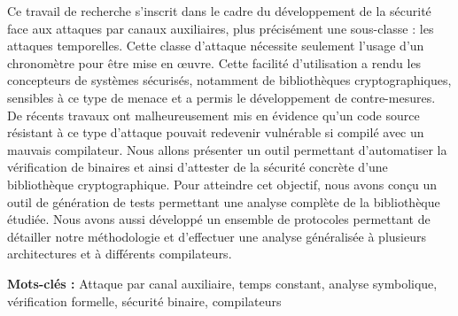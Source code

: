 Ce travail de recherche s'inscrit dans le cadre du développement de la sécurité face aux attaques par canaux auxiliaires, plus précisément une sous-classe : les attaques temporelles. Cette classe d'attaque nécessite seulement l'usage d'un chronomètre pour être mise en œuvre. Cette facilité d'utilisation a rendu les concepteurs de systèmes sécurisés, notamment de bibliothèques cryptographiques, sensibles à ce type de menace et a permis le développement de contre-mesures. De récents travaux ont malheureusement mis en évidence qu'un code source résistant à ce type d'attaque pouvait redevenir vulnérable si compilé avec un mauvais compilateur. Nous allons présenter un outil permettant d'automatiser la vérification de binaires et ainsi d'attester de la sécurité concrète d'une bibliothèque cryptographique. Pour atteindre cet objectif, nous avons conçu un outil de génération de tests permettant une analyse complète de la bibliothèque étudiée. Nous avons aussi développé un ensemble de protocoles permettant de détailler notre méthodologie et d'effectuer une analyse généralisée à plusieurs architectures et à différents compilateurs.

\bigbreak

\textbf{Mots-clés :} Attaque par canal auxiliaire, temps constant, analyse symbolique, vérification formelle, sécurité binaire, compilateurs
